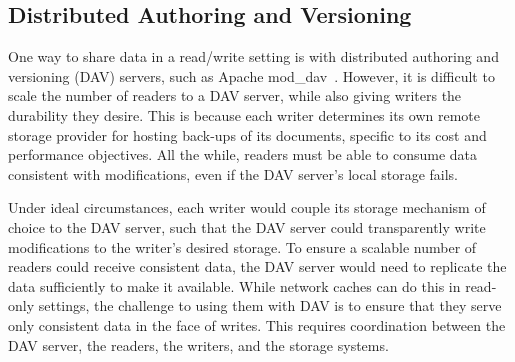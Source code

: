 

\subsection{Distributed Authoring and Versioning}

One way to share data in a read/write setting is with distributed authoring and versioning (DAV) servers, such as Apache mod\_dav~\cite{mod_dav}. However, it is difficult to scale the number of readers to a DAV server, while also giving writers the durability they desire.  This is because each writer determines its own remote storage provider for hosting back-ups of its documents, specific to its cost and performance objectives.  All the while, readers must be able to consume data consistent with modifications, even if the DAV server's local storage fails.

Under ideal circumstances, each writer would couple its storage mechanism of choice to the DAV server, such that the DAV server could transparently write modifications to the writer's desired storage.  To ensure a scalable number of readers could receive consistent data, the DAV server would need to replicate the data sufficiently to make it available.  While network caches can do this in read-only settings, the challenge to using them with DAV is to ensure that they serve only consistent data in the face of writes.  This requires coordination between the DAV server, the readers, the writers, and the storage systems.



